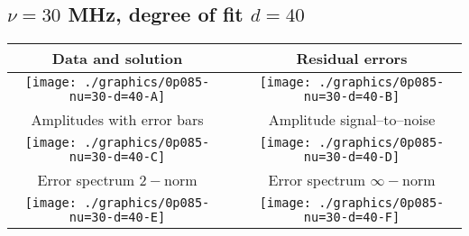 

% 

\clearpage{}
\break{}

\subsection{$\nu = 30$ MHz, degree of fit $d = 40$}

\begin{table}[h]
    \begin{center}
        \begin{tabular}{ccc}
            Data and solution & \quad & Residual errors \\\hline
            \texttt{[image: ./graphics/0p085-nu=30-d=40-A]} &&
            \texttt{[image: ./graphics/0p085-nu=30-d=40-B]} \\[15pt]
            Amplitudes with error bars && Amplitude signal--to--noise \\\hline
            \texttt{[image: ./graphics/0p085-nu=30-d=40-C]} &&
            \texttt{[image: ./graphics/0p085-nu=30-d=40-D]} \\[15pt]
            Error spectrum $2-$norm && Error spectrum $\infty-$norm \\\hline
            \texttt{[image: ./graphics/0p085-nu=30-d=40-E]} &&
            \texttt{[image: ./graphics/0p085-nu=30-d=40-F]} \\[15pt]
        \end{tabular}
    \end{center}
\label{fig:elev=85, nu=30}
\end{table}



\endinput

